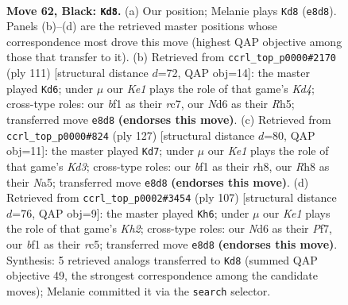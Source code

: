 \documentclass[11pt]{article}
\begin{document}
\clearpage

\begin{figure}[p]\centering
\begin{subfigure}{0.46\textwidth}\centering
\resizebox{\linewidth}{!}{%
\newchessgame
\chessboard[
  setfen={4k2r/R6p/P2n4/2r5/8/1Pp3KP/R1P3P1/5B2 b - - 2 62},
  showmover=false,
  pgfstyle=straightmove, color=movearrow, markmove={e8-d8}
]}
\caption{}
\end{subfigure}\hfill
\begin{subfigure}{0.46\textwidth}\centering
\resizebox{\linewidth}{!}{%
\newchessgame
\chessboard[
  setfen={6r1/2R1P1p1/p7/1p1k3r/8/P1B5/KPP5/8 b - - 1 56},
  showmover=false,
  pgfstyle=straightmove, color=movearrow, markmove={d5-d6}
]}
\caption{}
\end{subfigure}
\\[4pt]
\begin{subfigure}{0.46\textwidth}\centering
\resizebox{\linewidth}{!}{%
\newchessgame
\chessboard[
  setfen={7R/8/1p1k4/nP6/2pr4/5P1P/6P1/5BK1 b - - 4 64},
  showmover=false,
  pgfstyle=straightmove, color=movearrow, markmove={d6-d7}
]}
\caption{}
\end{subfigure}\hfill
\begin{subfigure}{0.46\textwidth}\centering
\resizebox{\linewidth}{!}{%
\newchessgame
\chessboard[
  setfen={8/r4p1k/8/2R5/p5RP/6PK/r1P5/8 b - - 9 54},
  showmover=false,
  pgfstyle=straightmove, color=movearrow, markmove={h7-h6}
]}
\caption{}
\end{subfigure}
\caption{\textbf{Move 62, Black: \texttt{Kd8}.} (a) Our position; Melanie plays \texttt{Kd8} (\texttt{e8d8}). Panels (b)--(d) are the retrieved master positions whose correspondence most drove this move (highest QAP objective among those that transfer to it). (b) Retrieved from \texttt{ccrl\_top\_p0000\#2170} (ply 111) [structural distance $d$=72, QAP obj=14]: the master played \texttt{Kd6}; under $\mu$ our \emph{Ke1} plays the role of that game's \emph{Kd4}; cross-type roles: our \emph{b}f1 as their \emph{r}c7, our \emph{N}d6 as their \emph{R}h5; transferred move \texttt{e8d8} \textbf{(endorses this move)}. (c) Retrieved from \texttt{ccrl\_top\_p0000\#824} (ply 127) [structural distance $d$=80, QAP obj=11]: the master played \texttt{Kd7}; under $\mu$ our \emph{Ke1} plays the role of that game's \emph{Kd3}; cross-type roles: our \emph{b}f1 as their \emph{r}h8, our \emph{R}h8 as their \emph{N}a5; transferred move \texttt{e8d8} \textbf{(endorses this move)}. (d) Retrieved from \texttt{ccrl\_top\_p0002\#3454} (ply 107) [structural distance $d$=76, QAP obj=9]: the master played \texttt{Kh6}; under $\mu$ our \emph{Ke1} plays the role of that game's \emph{Kh2}; cross-type roles: our \emph{N}d6 as their \emph{P}f7, our \emph{b}f1 as their \emph{r}c5; transferred move \texttt{e8d8} \textbf{(endorses this move)}. Synthesis: 5 retrieved analogs transferred to \texttt{Kd8} (summed QAP objective 49, the strongest correspondence among the candidate moves); Melanie committed it via the \texttt{search} selector.}
\label{fig:thought-m123}
\end{figure}
\end{document}
